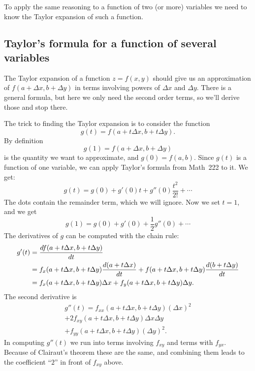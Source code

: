 To apply the same reasoning to a function of two (or more) variables
we need to know the Taylor expansion of such a function.

\subsection{Taylor's formula for a function of several variables}
\label{sec:Taylor-derived}
The Taylor expansion of a function $z=f(x, y)$ should give us an
approximation of $f(a+\Delta x, b+\Delta y)$ in terms involving powers
of $\Delta x$ and $\Delta y$.  There is a general formula, but here we
only need the second order terms, so we'll derive those and stop
there.

The trick to finding the Taylor expansion is to consider the function
\begin{equation}
  g(t) = f(a+t\Delta x, b+t\Delta y).
\end{equation}
By definition
\[
g(1) = f(a+\Delta x, b+\Delta y)
\]
is the quantity we want to approximate, and $g(0) = f(a, b)$.  Since
$g(t)$ is a function of one variable, we can apply Taylor's formula
from Math~222 to it.  We get:
\begin{equation}\label{eq:03gtaylor}
  g(t) = g(0) + g'(0) t + g''(0)\frac{t^2}{2!} + \cdots
\end{equation}
The dots contain the remainder term, which we will ignore.  Now we set
$t=1$, and we get
\[
g(1) = g(0) + g'(0) + \frac{1}{2} g''(0)+ \cdots
\]
The derivatives of $g$ can be computed with the chain rule:
\begin{align}\label{eq:03-gfirstderiv}
  g'(t)
  &= \frac{d f(a+t\Delta x, b+t \Delta y)}{dt} \\
  &= f_x(a+t\Delta x, b+t \Delta y)\frac{d(a+t\Delta x)}{dt}
  + f(a+t\Delta x, b+t \Delta y)\frac{d(b+t\Delta y)}{dt}\notag \\
  &= f_x(a+t\Delta x, b+t \Delta y)\Delta x + f_y(a+t\Delta x, b+t
  \Delta y) \Delta y.\notag
\end{align}
The second derivative is
\begin{multline}\label{eq:03-gseconderiv}
  g''(t) = f_{xx}(a+t\Delta x, b+t \Delta y)(\Delta x)^2 \\
  + 2f_{xy}(a+t\Delta x, b+t \Delta y) \Delta x\Delta y\\
  + f_{yy}(a+t\Delta x, b+t \Delta y) (\Delta y)^2.
\end{multline}
In computing $g''(t)$ we run into terms involving $f_{xy}$ and terms
with $f_{yx}$.  Because of Clairaut's theorem these are the same, and
combining them leads to the coefficient ``$2$'' in front of $f_{xy}$
above.

